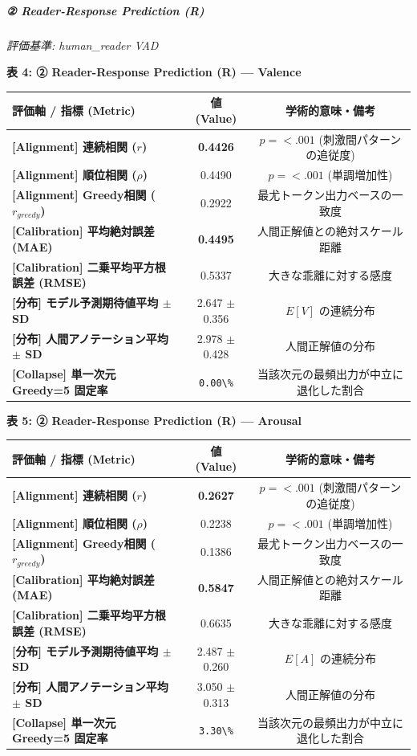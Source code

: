 \subparagraph{② Reader-Response Prediction (R)}
\textit{評価基準: human\_reader VAD}

\textbf{表 4: ② Reader-Response Prediction (R) — Valence}
\begin{center}
\small
\begin{tabular}{lcc}
\toprule
\textbf{評価軸 / 指標 (Metric)} & \textbf{値 (Value)} & \textbf{学術的意味・備考} \\
\midrule
\textbf{[Alignment] 連続相関 ($r$)} & \textbf{0.4426} & $p = <.001 $ (刺激間パターンの追従度) \\
\textbf{[Alignment] 順位相関 ($\rho$)} & 0.4490 & $p = <.001 $ (単調増加性) \\
\textbf{[Alignment] Greedy相関 ($r_{greedy}$)} & 0.2922 & 最尤トークン出力ベースの一致度 \\
\textbf{[Calibration] 平均絶対誤差 (MAE)} & \textbf{0.4495} & 人間正解値との絶対スケール距離 \\
\textbf{[Calibration] 二乗平均平方根誤差 (RMSE)} & 0.5337 & 大きな乖離に対する感度 \\
\textbf{[分布] モデル予測期待値平均 $\pm$ SD} & 2.647 $\pm$ 0.356 & $E[V]$ の連続分布 \\
\textbf{[分布] 人間アノテーション平均 $\pm$ SD} & 2.978 $\pm$ 0.428 & 人間正解値の分布 \\
\textbf{[Collapse] 単一次元 Greedy=5 固定率} & \texttt{0.00\textbackslash{}\%} & 当該次元の最頻出力が中立に退化した割合 \\
\bottomrule
\end{tabular}
\end{center}


\textbf{表 5: ② Reader-Response Prediction (R) — Arousal}
\begin{center}
\small
\begin{tabular}{lcc}
\toprule
\textbf{評価軸 / 指標 (Metric)} & \textbf{値 (Value)} & \textbf{学術的意味・備考} \\
\midrule
\textbf{[Alignment] 連続相関 ($r$)} & \textbf{0.2627} & $p = <.001 $ (刺激間パターンの追従度) \\
\textbf{[Alignment] 順位相関 ($\rho$)} & 0.2238 & $p = <.001 $ (単調増加性) \\
\textbf{[Alignment] Greedy相関 ($r_{greedy}$)} & 0.1386 & 最尤トークン出力ベースの一致度 \\
\textbf{[Calibration] 平均絶対誤差 (MAE)} & \textbf{0.5847} & 人間正解値との絶対スケール距離 \\
\textbf{[Calibration] 二乗平均平方根誤差 (RMSE)} & 0.6635 & 大きな乖離に対する感度 \\
\textbf{[分布] モデル予測期待値平均 $\pm$ SD} & 2.487 $\pm$ 0.260 & $E[A]$ の連続分布 \\
\textbf{[分布] 人間アノテーション平均 $\pm$ SD} & 3.050 $\pm$ 0.313 & 人間正解値の分布 \\
\textbf{[Collapse] 単一次元 Greedy=5 固定率} & \texttt{3.30\textbackslash{}\%} & 当該次元の最頻出力が中立に退化した割合 \\
\bottomrule
\end{tabular}
\end{center}


